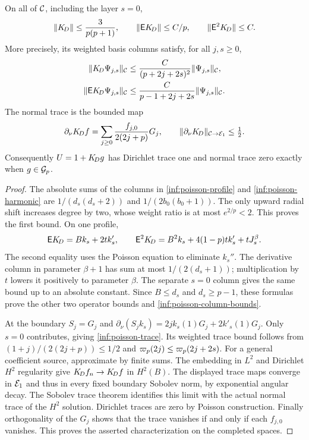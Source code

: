 \begin{proposition}
\label{inf:poisson-bounds}
On all of $\mathcal C$, including the layer $s=0$,
\begin{equation}\label{inf:poisson-operator-bounds}
 \lVert K_{\!D}\rVert\le\frac3{p(p+1)},\qquad
 \lVert \mathsf EK_{\!D}\rVert\le C/p,\qquad
 \lVert \mathsf E^2K_{\!D}\rVert\le C.
\end{equation}
More precisely, its weighted basis columns satisfy, for all $j,s\ge0$,
\begin{align}
 \lVert K_{\!D}\Psi_{j,s}\rVert_\mathcal C
 &\le\frac{C}{(p+2j+2s)^2}\lVert \Psi_{j,s}\rVert_\mathcal C,\nonumber\\
 \lVert \mathsf EK_{\!D}\Psi_{j,s}\rVert_\mathcal C
 &\le\frac{C}{p-1+2j+2s}\lVert \Psi_{j,s}\rVert_\mathcal C.
 \label{inf:poisson-column-bounds}
\end{align}
The normal trace is the bounded map
\begin{equation}\label{inf:poisson-trace}
 \partial_\nu K_{\!D} f=
 \sum_{j\ge0}\frac{f_{j,0}}{2(2j+p)}G_j,
 \qquad
 \lVert \partial_\nu K_{\!D}\rVert_{\mathcal C\to\mathcal E_1}\le\tfrac12.
\end{equation}
Consequently $U=1+K_{\!D} g$ has Dirichlet trace one and normal trace
zero exactly when $g\in\mathcal{G}_p$.
\end{proposition}
\begin{proof}
The absolute sums of the columns in
\eqref{inf:poisson-profile} and \eqref{inf:poisson-harmonic} are
$1/(d_s(d_s+2))$ and $1/(2b_0(b_0+1))$.
The only upward radial shift increases degree by two, whose
weight ratio is at most $e^{2/p}<2$. This proves the first bound.
On one profile,
\[
 \mathsf EK_{\!D}=Bk_s+2tk'_s,\qquad
 \mathsf E^2K_{\!D}=B^2k_s+4(1-p)tk'_s+tJ_s^\beta.
\]
The second equality uses the Poisson equation to eliminate $k_s''$.
The derivative column in parameter $\beta+1$ has sum at most
$1/(2(d_s+1))$; multiplication by $t$ lowers it positively to
parameter $\beta$. The separate $s=0$ column gives the same bound
up to an absolute constant. Since $B\le d_s$ and $d_s\ge p-1$,
these formulas prove the other two operator bounds and
\eqref{inf:poisson-column-bounds}.

At the boundary $S_j=G_j$ and
$\partial_\nu(S_jk_s)=2jk_s(1)G_j+2k'_s(1)G_j$.
Only $s=0$ contributes, giving \eqref{inf:poisson-trace}.
Its weighted trace bound follows from
$(1+j)/(2(2j+p))\le1/2$ and
$\varpi_p(2j)\le\varpi_p(2j+2s)$.
For a general coefficient source, approximate by finite sums.
The embedding in $L^2$ and Dirichlet $H^2$ regularity give
$K_{\!D} f_n\to K_{\!D} f$ in $H^2(B)$.
The displayed trace maps converge in $\mathcal E_1$ and thus in every
fixed boundary Sobolev norm, by exponential angular decay.
The Sobolev trace theorem identifies this limit with the actual
normal trace of the $H^2$ solution. Dirichlet traces are zero by
Poisson construction. Finally orthogonality of the $G_j$ shows
that the trace vanishes if and only if each $f_{j,0}$ vanishes.
This proves the asserted characterization on the completed spaces.
\end{proof}

